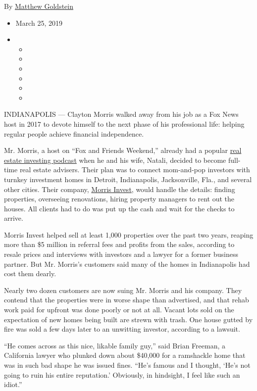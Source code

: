 By \href{https://www.nytimes.com/by/matthew-goldstein}{Matthew
Goldstein}

\begin{itemize}
\item
  March 25, 2019
\item
  \begin{itemize}
  \item
  \item
  \item
  \item
  \item
  \item
  \end{itemize}
\end{itemize}

INDIANAPOLIS --- Clayton Morris walked away from his job as a Fox News
host in 2017 to devote himself to the next phase of his professional
life: helping regular people achieve financial independence.

Mr. Morris, a host on ``Fox and Friends Weekend,'' already had a popular
\href{https://itunes.apple.com/us/podcast/investing-in-real-estate-clayton-morris-build-financial/id1115024566?mt=2}{real
estate investing podcast} when he and his wife, Natali, decided to
become full-time real estate advisers. Their plan was to connect
mom-and-pop investors with turnkey investment homes in Detroit,
Indianapolis, Jacksonville, Fla., and several other cities. Their
company, \href{https://morrisinvest.com/}{Morris Invest}, would handle
the details: finding properties, overseeing renovations, hiring property
managers to rent out the houses. All clients had to do was put up the
cash and wait for the checks to arrive.

Morris Invest helped sell at least 1,000 properties over the past two
years, reaping more than \$5 million in referral fees and profits from
the sales, according to resale prices and interviews with investors and
a lawyer for a former business partner. But Mr. Morris's customers said
many of the homes in Indianapolis had cost them dearly.

Nearly two dozen customers are now suing Mr. Morris and his company.
They contend that the properties were in worse shape than advertised,
and that rehab work paid for upfront was done poorly or not at all.
Vacant lots sold on the expectation of new homes being built are strewn
with trash. One house gutted by fire was sold a few days later to an
unwitting investor, according to a lawsuit.

``He comes across as this nice, likable family guy,'' said Brian
Freeman, a California lawyer who plunked down about \$40,000 for a
ramshackle home that was in such bad shape he was issued fines. ``He's
famous and I thought, `He's not going to ruin his entire reputation.'
Obviously, in hindsight, I feel like such an idiot.''

